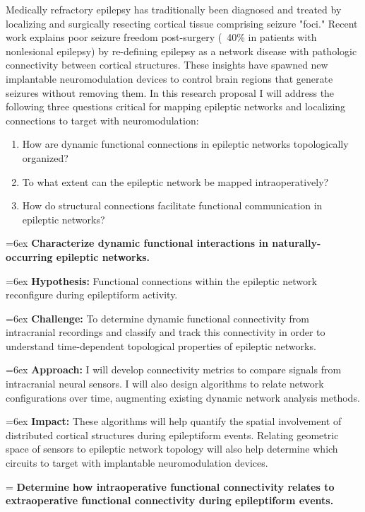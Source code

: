Medically refractory epilepsy has traditionally been diagnosed and treated by localizing and surgically resecting cortical tissue comprising seizure "foci." Recent work explains poor seizure freedom post-surgery (~40\% in patients with nonlesional epilepsy) by re-defining epilepsy as a network disease with pathologic connectivity between cortical structures. These insights have spawned new implantable neuromodulation devices to control brain regions that generate seizures without removing them. In this research proposal I will address the following three questions critical for mapping epileptic networks and localizing connections to target with neuromodulation:
\begin{enumerate}[topsep=1ex, itemsep=0pt]
    \item How are dynamic functional connections in epileptic networks topologically organized?
    \item To what extent can the epileptic network be mapped intraoperatively?
    \item How do structural connections facilitate functional communication in epileptic networks?
\end{enumerate}

\hangindent=6ex
\noindent
{} \textbf{Characterize dynamic functional interactions in naturally-occurring epileptic networks.}

\hangindent=6ex
\textbf{Hypothesis:} Functional connections within the epileptic network reconfigure during epileptiform activity.

\hangindent=6ex
\textbf{Challenge:} To determine dynamic functional connectivity from intracranial recordings and classify and track this connectivity in order to understand time-dependent topological properties of epileptic networks.

\hangindent=6ex
\textbf{Approach:} I will develop connectivity metrics to compare signals from intracranial neural sensors. I will also design algorithms to relate network configurations over time, augmenting existing dynamic network analysis methods.

\hangindent=6ex
\textbf{Impact:} These algorithms will help quantify the spatial involvement of distributed cortical structures during epileptiform events. Relating geometric space of sensors to epileptic network topology will also help determine which circuits to target with implantable neuromodulation devices.


\hangindent=\parindent
{}
\noindent
{} \textbf{Determine how intraoperative functional connectivity relates to extraoperative functional connectivity during epileptiform events.}

